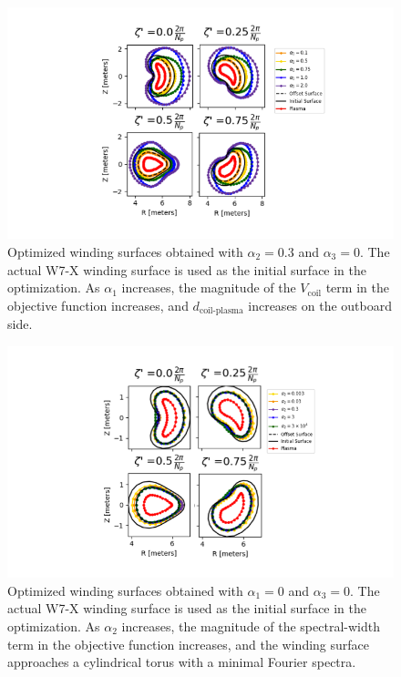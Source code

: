 \documentclass[aps,unsortedaddress]{revtex4-1}
\begin{document}
\begin{figure}
\includegraphics[width=.8\textwidth]{alpha1_scan.png}
\caption{Optimized winding surfaces obtained with $\alpha_2 = 0.3$ and $\alpha_3 = 0$. The actual W7-X winding surface is used as the initial surface in the optimization. As $\alpha_1$ increases, the magnitude of the $V_{\text{coil}}$ term in the objective function increases, and $d_{\text{coil-plasma}}$ increases on the outboard side. }
\label{alpha1_scan}
\end{figure}

\begin{figure}
\includegraphics[width=.8\textwidth]{alpha2_scan.png}
\caption{Optimized winding surfaces obtained with $\alpha_1 = 0$ and $\alpha_3 = 0$. The actual W7-X winding surface is used as the initial surface in the optimization. As $\alpha_2$ increases, the magnitude of the spectral-width term in the objective function increases, and the winding surface approaches a cylindrical torus with a minimal Fourier spectra.}
\label{alpha2_scan}
\end{figure}

\FloatBarrier
\end{document}
